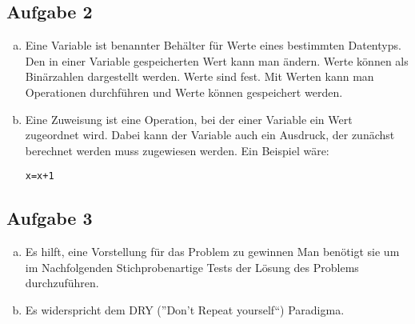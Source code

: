 \documentclass[11pt]{article}
\begin{document}
\subsection*{Aufgabe 2}
\begin{enumerate}[a)]

\item Eine Variable ist benannter Beh\"alter f\"ur Werte eines bestimmten Datentyps. Den in einer Variable gespeicherten Wert kann man \"andern. Werte k\"onnen als Bin\"arzahlen dargestellt werden. Werte sind fest. Mit Werten kann man Operationen durchf\"uhren und Werte k\"onnen gespeichert werden.

\item Eine Zuweisung ist eine Operation, bei der einer Variable ein Wert zugeordnet wird. Dabei kann der Variable auch ein Ausdruck, der zun\"achst  berechnet werden muss zugewiesen werden. Ein Beispiel w\"are:
\begin{lstlisting}
x=x+1
\end{lstlisting}

\end{enumerate}
\subsection*{Aufgabe 3}
\begin{enumerate}[a)]
  \item Es hilft, eine Vorstellung f\"ur das Problem zu gewinnen
    Man ben\"otigt sie um im Nachfolgenden Stichprobenartige Tests
    der L\"osung des Problems durchzuf\"uhren.
  \item
    Es widerspricht dem DRY (''Don't Repeat yourself``) Paradigma.
\end{enumerate}
\end{document}
